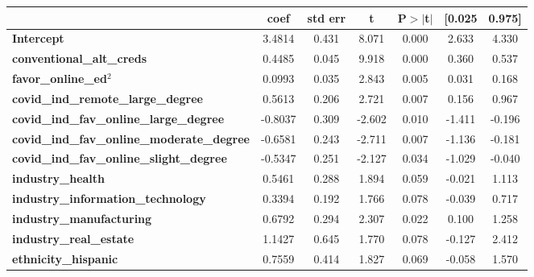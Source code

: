 {
\def\sym#1{\ifmmode^{#1}\else\(^{#1}\)\fi}
\begin{tabular}{lcccccc}
\toprule
                                                   & \textbf{coef} & \textbf{std err} & \textbf{t} & \textbf{P$> |$t$|$} & \textbf{[0.025} & \textbf{0.975]}  \\
\midrule
\textbf{Intercept}                                 &       3.4814  &        0.431     &     8.071  &         0.000        &        2.633    &        4.330     \\
\textbf{conventional\_alt\_creds}                  &       0.4485  &        0.045     &     9.918  &         0.000        &        0.360    &        0.537     \\
\textbf{favor\_online\_ed}$^2$                     &       0.0993  &        0.035     &     2.843  &         0.005        &        0.031    &        0.168     \\
\textbf{covid\_ind\_remote\_large\_degree}         &       0.5613  &        0.206     &     2.721  &         0.007        &        0.156    &        0.967     \\
\textbf{covid\_ind\_fav\_online\_large\_degree}    &      -0.8037  &        0.309     &    -2.602  &         0.010        &       -1.411    &       -0.196     \\
\textbf{covid\_ind\_fav\_online\_moderate\_degree} &      -0.6581  &        0.243     &    -2.711  &         0.007        &       -1.136    &       -0.181     \\
\textbf{covid\_ind\_fav\_online\_slight\_degree}   &      -0.5347  &        0.251     &    -2.127  &         0.034        &       -1.029    &       -0.040     \\
\textbf{industry\_health}                          &       0.5461  &        0.288     &     1.894  &         0.059        &       -0.021    &        1.113     \\
\textbf{industry\_information\_technology}         &       0.3394  &        0.192     &     1.766  &         0.078        &       -0.039    &        0.717     \\
\textbf{industry\_manufacturing}                   &       0.6792  &        0.294     &     2.307  &         0.022        &        0.100    &        1.258     \\
\textbf{industry\_real\_estate}                    &       1.1427  &        0.645     &     1.770  &         0.078        &       -0.127    &        2.412     \\
\textbf{ethnicity\_hispanic}                       &       0.7559  &        0.414     &     1.827  &         0.069        &       -0.058    &        1.570     \\

\end{tabular}}
